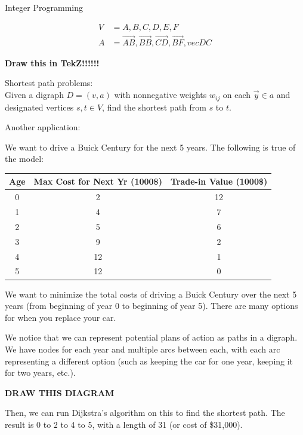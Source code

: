 \documentclass{article}
\begin{document}
\begin{section}{Integer Programming}
\begin{eg}
    \begin{align*}
        V&={A,B,C,D,E,F} \\
        A&={\vec{AB}, \vec{BB}, \vec{CD}, \vec{BF}, vec{DC}}
    \end{align*}

    \textbf{Draw this in TekZ!!!!!!}
\end{eg}

Shortest path problems: \\
Given a digraph \(D=(v,a)\) with nonnegative weights \(w_{ij}\) on each \(\vec{y}\in a\) and 
designated vertices \(s,t\in V\), find the shortest path from \(s\) to \(t\).  

Another application:\\
\begin{eg}
    We want to drive a Buick Century for the next 5 years. The following is true of the model: \\
    \begin{tabular}{c | c | c }
        Age & Max Cost for Next Yr (1000\$) & Trade-in Value (1000\$)\\
        \hline
        0 & 2 & 12 \\
        1 & 4 & 7 \\
        2 & 5 & 6 \\
        3 & 9 & 2 \\
        4 & 12 & 1 \\
        5 & 12 & 0 \\
    \end{tabular}

    We want to minimize the total costs of driving a Buick Century over the next 5 years (from 
    beginning of year 0 to beginning of year 5). There are many options for when you replace your car.
\end{eg}
\begin{answer}
    We notice that we can represent potential plans of action as paths in a digraph. We have nodes for 
    each year and multiple arcs between each, with each arc representing a different option (such as keeping 
    the car for one year, keeping it for two years, etc.).

    \textbf{DRAW THIS DIAGRAM}

    Then, we can run Dijkstra's algorithm on this to find the shortest path. The result is 
    0 to 2 to 4 to 5, with a length of 31 (or cost of \$31,000).
\end{answer}


\end{section}
\end{document}

